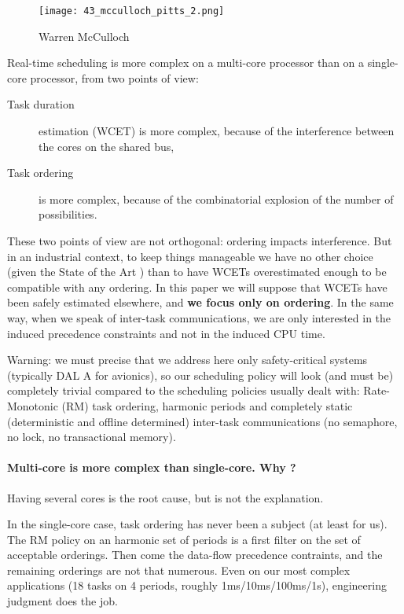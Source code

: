 \documentclass[a4paper]{article}
\begin{document}
\begin{figure}[h]
\texttt{[image: 43\_mcculloch\_pitts\_2.png]}
\caption{Warren McCulloch}
\end{figure}

Real-time scheduling is more complex on a multi-core processor than on a single-core processor, from two points of view:
\begin{description}
\item[Task duration]
estimation (WCET) is more complex, because of the interference between the cores on the shared bus,
\item[Task ordering]
is more complex, because of the combinatorial explosion of the number of possibilities.
\end{description}
These two points of view are not orthogonal: ordering impacts interference.
But in an industrial context, to keep things manageable we have no other choice (given the State of the Art \cite{DBLP:journals/csur/MaizaRRGAD19})
than to have WCETs overestimated enough to be compatible with any ordering.
In this paper we will suppose that WCETs have been safely estimated elsewhere,
and \textbf{we focus only on ordering}.
In the same way, when we speak of inter-task communications, we are only interested in the induced precedence constraints
and not in the induced CPU time.

Warning: we must precise that we address here only safety-critical systems (typically DAL A for avionics),
so our scheduling policy will look (and must be) completely trivial
compared to the scheduling policies usually dealt with: Rate-Monotonic (RM) task ordering, harmonic periods and completely static (deterministic and offline determined)
inter-task communications (no semaphore, no lock, no transactional memory).

\paragraph*{Multi-core is more complex than single-core. Why ?}

Having several cores is the root cause, but is not the explanation.

In the single-core case, task ordering has never been a subject (at least for us).
The RM policy on an harmonic set of periods is a first filter on the set of acceptable orderings.
Then come the data-flow precedence contraints, and the remaining orderings are not that numerous.
Even on our most complex applications (18 tasks on 4 periods, roughly 1ms/10ms/100ms/1s), engineering judgment does the job.
\end{document}
